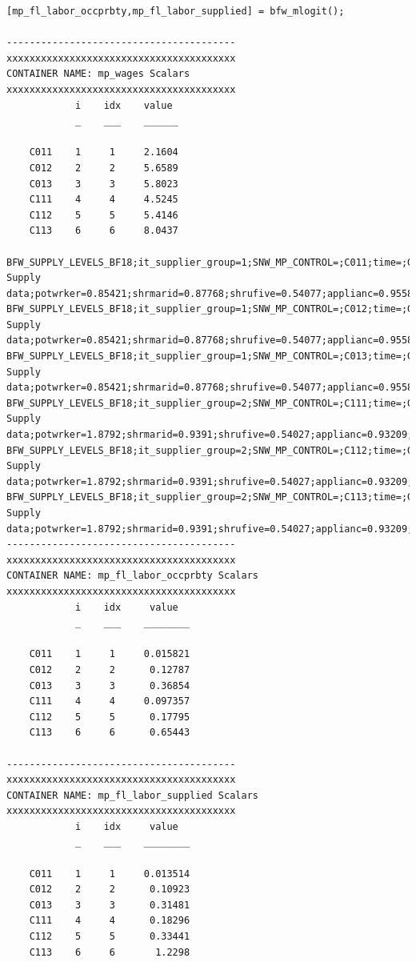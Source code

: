 \documentclass[
]{book}
\begin{document}
\begin{verbatim}
[mp_fl_labor_occprbty,mp_fl_labor_supplied] = bfw_mlogit();

----------------------------------------
xxxxxxxxxxxxxxxxxxxxxxxxxxxxxxxxxxxxxxxx
CONTAINER NAME: mp_wages Scalars
xxxxxxxxxxxxxxxxxxxxxxxxxxxxxxxxxxxxxxxx
            i    idx    value 
            _    ___    ______

    C011    1     1     2.1604
    C012    2     2     5.6589
    C013    3     3     5.8023
    C111    4     4     4.5245
    C112    5     5     5.4146
    C113    6     6     8.0437

BFW_SUPPLY_LEVELS_BF18;it_supplier_group=1;SNW_MP_CONTROL=;C011;time=;G01;fl_wage=2.1604
Supply data;potwrker=0.85421;shrmarid=0.87768;shrufive=0.54077;applianc=0.95588;jobscrys=0.613
BFW_SUPPLY_LEVELS_BF18;it_supplier_group=1;SNW_MP_CONTROL=;C012;time=;G01;fl_wage=5.6589
Supply data;potwrker=0.85421;shrmarid=0.87768;shrufive=0.54077;applianc=0.95588;jobscrys=0.613
BFW_SUPPLY_LEVELS_BF18;it_supplier_group=1;SNW_MP_CONTROL=;C013;time=;G01;fl_wage=5.8023
Supply data;potwrker=0.85421;shrmarid=0.87768;shrufive=0.54077;applianc=0.95588;jobscrys=0.613
BFW_SUPPLY_LEVELS_BF18;it_supplier_group=2;SNW_MP_CONTROL=;C111;time=;G11;fl_wage=4.5245
Supply data;potwrker=1.8792;shrmarid=0.9391;shrufive=0.54027;applianc=0.93209;jobscrys=0.613
BFW_SUPPLY_LEVELS_BF18;it_supplier_group=2;SNW_MP_CONTROL=;C112;time=;G11;fl_wage=5.4146
Supply data;potwrker=1.8792;shrmarid=0.9391;shrufive=0.54027;applianc=0.93209;jobscrys=0.613
BFW_SUPPLY_LEVELS_BF18;it_supplier_group=2;SNW_MP_CONTROL=;C113;time=;G11;fl_wage=8.0437
Supply data;potwrker=1.8792;shrmarid=0.9391;shrufive=0.54027;applianc=0.93209;jobscrys=0.613
----------------------------------------
xxxxxxxxxxxxxxxxxxxxxxxxxxxxxxxxxxxxxxxx
CONTAINER NAME: mp_fl_labor_occprbty Scalars
xxxxxxxxxxxxxxxxxxxxxxxxxxxxxxxxxxxxxxxx
            i    idx     value  
            _    ___    ________

    C011    1     1     0.015821
    C012    2     2      0.12787
    C013    3     3      0.36854
    C111    4     4     0.097357
    C112    5     5      0.17795
    C113    6     6      0.65443

----------------------------------------
xxxxxxxxxxxxxxxxxxxxxxxxxxxxxxxxxxxxxxxx
CONTAINER NAME: mp_fl_labor_supplied Scalars
xxxxxxxxxxxxxxxxxxxxxxxxxxxxxxxxxxxxxxxx
            i    idx     value  
            _    ___    ________

    C011    1     1     0.013514
    C012    2     2      0.10923
    C013    3     3      0.31481
    C111    4     4      0.18296
    C112    5     5      0.33441
    C113    6     6       1.2298


\end{verbatim}
\end{document}
